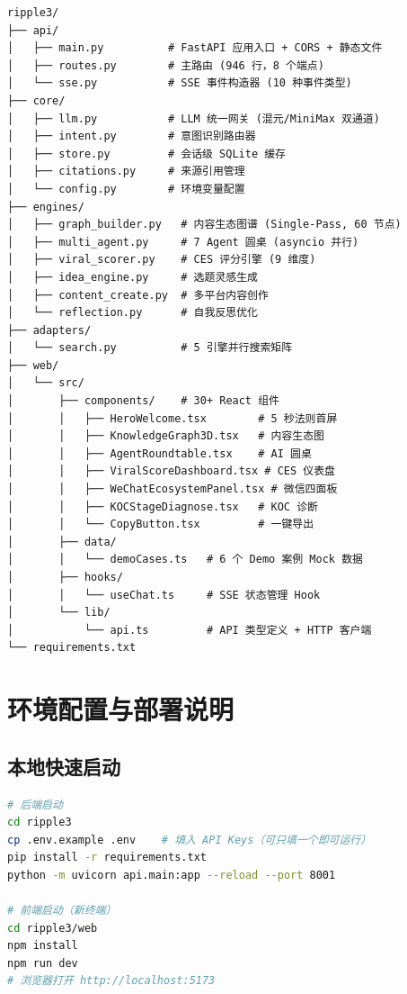 \documentclass[12pt,a4paper]{ctexart}
\begin{document}
\begin{lstlisting}[style=pycode,caption={Ripple v3 完整项目结构}]
ripple3/
├── api/
│   ├── main.py          # FastAPI 应用入口 + CORS + 静态文件
│   ├── routes.py        # 主路由 (946 行，8 个端点)
│   └── sse.py           # SSE 事件构造器 (10 种事件类型)
├── core/
│   ├── llm.py           # LLM 统一网关 (混元/MiniMax 双通道)
│   ├── intent.py        # 意图识别路由器
│   ├── store.py         # 会话级 SQLite 缓存
│   ├── citations.py     # 来源引用管理
│   └── config.py        # 环境变量配置
├── engines/
│   ├── graph_builder.py   # 内容生态图谱 (Single-Pass, 60 节点)
│   ├── multi_agent.py     # 7 Agent 圆桌 (asyncio 并行)
│   ├── viral_scorer.py    # CES 评分引擎 (9 维度)
│   ├── idea_engine.py     # 选题灵感生成
│   ├── content_create.py  # 多平台内容创作
│   └── reflection.py      # 自我反思优化
├── adapters/
│   └── search.py          # 5 引擎并行搜索矩阵
├── web/
│   └── src/
│       ├── components/    # 30+ React 组件
│       │   ├── HeroWelcome.tsx        # 5 秒法则首屏
│       │   ├── KnowledgeGraph3D.tsx   # 内容生态图
│       │   ├── AgentRoundtable.tsx    # AI 圆桌
│       │   ├── ViralScoreDashboard.tsx # CES 仪表盘
│       │   ├── WeChatEcosystemPanel.tsx # 微信四面板
│       │   ├── KOCStageDiagnose.tsx   # KOC 诊断
│       │   └── CopyButton.tsx         # 一键导出
│       ├── data/
│       │   └── demoCases.ts   # 6 个 Demo 案例 Mock 数据
│       ├── hooks/
│       │   └── useChat.ts     # SSE 状态管理 Hook
│       └── lib/
│           └── api.ts         # API 类型定义 + HTTP 客户端
└── requirements.txt
\end{lstlisting}

\section{环境配置与部署说明}

\subsection{本地快速启动}

\begin{lstlisting}[style=pycode,language=bash,caption={本地启动命令}]
# 后端启动
cd ripple3
cp .env.example .env    # 填入 API Keys（可只填一个即可运行）
pip install -r requirements.txt
python -m uvicorn api.main:app --reload --port 8001

# 前端启动（新终端）
cd ripple3/web
npm install
npm run dev
# 浏览器打开 http://localhost:5173
\end{lstlisting}
\end{document}

